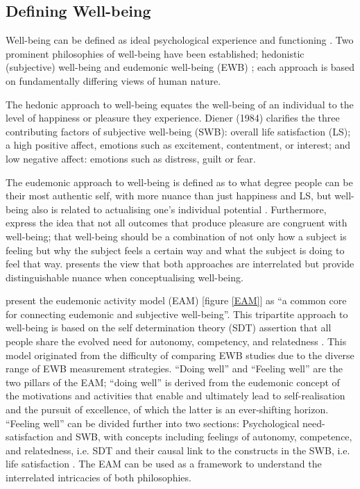 \documentclass[12pt]{article}
\begin{document}
\subsection{Defining Well-being}

Well-being can be defined as ideal psychological experience and functioning \parencite{ryan_happiness_2001}. Two prominent philosophies of well-being have been established; hedonistic (subjective) well-being \parencite{dienerSubjectiveWellbeing1984} and eudemonic well-being (EWB) \parencite{watermanTwoConceptionsHappiness1993}; each approach is based on fundamentally differing views of human nature.

The hedonic approach to well-being equates the well-being of an individual to the level of happiness or pleasure they experience. Diener (1984) clarifies the three contributing factors of subjective well-being (SWB): overall life satisfaction (LS); a high positive affect, emotions such as excitement, contentment, or interest; and low negative affect: emotions such as distress, guilt or fear.

The eudemonic approach to well-being is defined as to what degree people can be their most authentic self, with more nuance than just happiness and LS, but well-being also is related to actualising one’s individual potential \parencite{watermanTwoConceptionsHappiness1993}. Furthermore, \textcite{martela_clarifying_2019} express the idea that not all outcomes that produce pleasure are congruent with well-being; that well-being should be a combination of not only how a subject is feeling but why the subject feels a certain way and what the subject is doing to feel that way. \textcite{waterman_reconsidering_2008} presents the view that both approaches are interrelated but provide distinguishable nuance when conceptualising well-being. 

\textcite{martela_clarifying_2019} present the eudemonic activity model (EAM) [figure \ref{EAM}] as “a common core for connecting eudemonic and subjective well-being”. This tripartite approach to well-being is based on the self determination theory (SDT) assertion that all people share the evolved need for autonomy, competency, and relatedness \parencite{ryan_happiness_2001}. This model originated from the difficulty of comparing EWB studies due to the diverse range of EWB measurement strategies. “Doing well” and “Feeling well” are the two pillars of the EAM; “doing well” is derived from the eudemonic concept of the motivations and activities that enable and ultimately lead to self-realisation and the pursuit of excellence, of which the latter is an ever-shifting horizon. “Feeling well” can be divided further into two sections: Psychological need-satisfaction and SWB, with concepts including feelings of autonomy, competence, and relatedness, i.e. SDT and their causal link to the constructs in the SWB, i.e. life satisfaction \parencite{forgas_understanding_2018}. The EAM can be used as a framework to understand the interrelated intricacies of both philosophies.
\end{document}
